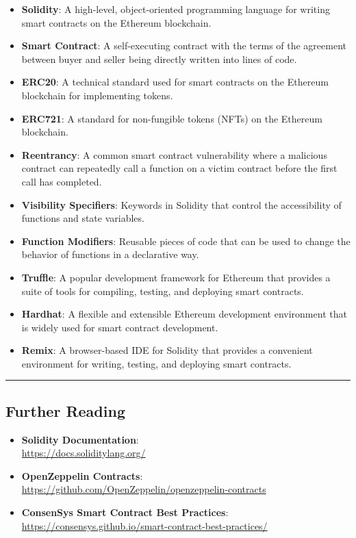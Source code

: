 \begin{itemize}
	\tightlist
	\item
	\textbf{Solidity}: A high-level, object-oriented programming language
	for writing smart contracts on the Ethereum blockchain.
	\item
	\textbf{Smart Contract}: A self-executing contract with the terms of
	the agreement between buyer and seller being directly written into
	lines of code.
	\item
	\textbf{ERC20}: A technical standard used for smart contracts on the
	Ethereum blockchain for implementing tokens.
	\item
	\textbf{ERC721}: A standard for non-fungible tokens (NFTs) on the
	Ethereum blockchain.
	\item
	\textbf{Reentrancy}: A common smart contract vulnerability where a
	malicious contract can repeatedly call a function on a victim contract
	before the first call has completed.
	\item
	\textbf{Visibility Specifiers}: Keywords in Solidity that control the
	accessibility of functions and state variables.
	\item
	\textbf{Function Modifiers}: Reusable pieces of code that can be used
	to change the behavior of functions in a declarative way.
	\item
	\textbf{Truffle}: A popular development framework for Ethereum that
	provides a suite of tools for compiling, testing, and deploying smart
	contracts.
	\item
	\textbf{Hardhat}: A flexible and extensible Ethereum development
	environment that is widely used for smart contract development.
	\item
	\textbf{Remix}: A browser-based IDE for Solidity that provides a
	convenient environment for writing, testing, and deploying smart
	contracts.
\end{itemize}

\begin{center}\rule{0.5\linewidth}{0.5pt}\end{center}

\subsection{Further Reading}\label{further-reading}

\begin{itemize}
	\tightlist
	\item
	\textbf{Solidity Documentation}: \\
	\url{https://docs.soliditylang.org/}
	\item
	\textbf{OpenZeppelin Contracts}: \\
	\url{https://github.com/OpenZeppelin/openzeppelin-contracts}
	\item
	\textbf{ConsenSys Smart Contract Best Practices}: \\
	\url{https://consensys.github.io/smart-contract-best-practices/}
\end{itemize}
